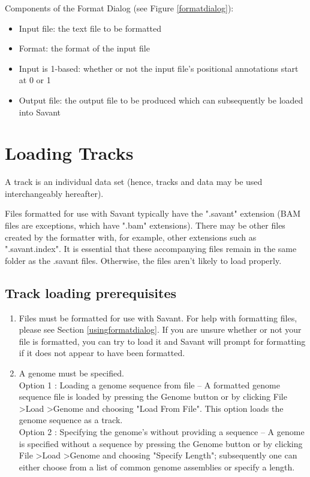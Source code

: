 \documentclass{report}
\begin{document}
Components of the Format Dialog (see Figure \ref{formatdialog}):
\begin{itemize}
\item Input file: the text file to be formatted
\item Format: the format of the input file
\item Input is 1-based: whether or not the input file's positional annotations start at 0 or 1
\item Output file: the output file to be produced which can subsequently be loaded into Savant
\end{itemize}

\section{Loading Tracks}

A track is an individual data set (hence, tracks and data may be used interchangeably hereafter).

Files formatted for use with Savant typically have the ".savant" extension (BAM files are exceptions, which have ".bam" extensions). There may be other files created by the formatter with, for example, other extensions such as ".savant.index". It is essential that these accompanying files remain in the same folder as the .savant files. Otherwise, the files aren't likely to load properly.

\subsection{Track loading prerequisites}

\begin{enumerate}
\item Files must be formatted for use with Savant. For help with formatting files, please see Section \ref{usingformatdialog}. If you are unsure whether or not your file is formatted, you can try to load it and Savant will prompt for formatting if it does not appear to have been formatted.
\item A genome must be specified.\\
Option 1 : Loading a genome sequence from file -- A formatted genome sequence file is loaded by pressing the Genome button or by clicking File \textgreater Load \textgreater Genome and choosing "Load From File". This option loads the genome sequence as a track.\\
Option 2 : Specifying the genome's without providing a sequence -- A genome is specified without a sequence by pressing the Genome button or by clicking File \textgreater Load \textgreater Genome and choosing "Specify Length"; subsequently one can either choose from a list of common genome assemblies or specify a length.
\end{enumerate}
\end{document}
